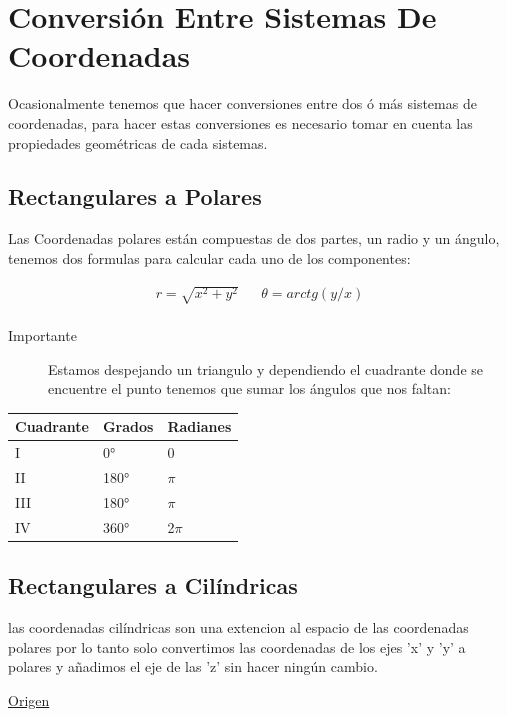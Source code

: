 \documentclass{article}
\begin{document}
\section{Conversión Entre Sistemas De Coordenadas}
\label{sec:org9221d06}
Ocasionalmente tenemos que hacer conversiones entre dos ó más sistemas de coordenadas, para hacer estas conversiones es necesario tomar en cuenta las propiedades geométricas de cada sistemas.

\subsection{Rectangulares a Polares}
\label{sec:org0ee6b6f}
Las Coordenadas polares están compuestas de dos partes, un radio y un ángulo, tenemos dos formulas para calcular cada uno de los componentes: 

\[\begin{aligned}
 r = \sqrt{x^2+y^2} && \theta = arctg\left(y/x\right) \\
\end{aligned}\] 

\begin{description}
\item[{Importante}] Estamos despejando un triangulo y dependiendo el cuadrante donde se encuentre el punto tenemos que sumar los ángulos que nos faltan:
\end{description}

\begin{center}
\label{tab:org97f36ce}
\begin{tabular}{lll}
Cuadrante & Grados & Radianes\\
\hline
I & 0° & 0\\
II & 180° & \(\pi\)\\
III & 180° & \(\pi\)\\
IV & 360° & 2\(\pi\)\\
\end{tabular}
\end{center}

\subsection{Rectangulares a Cilíndricas}
\label{sec:orgc6924c7}
las coordenadas cilíndricas son una extencion al espacio de las coordenadas polares por lo tanto solo convertimos las coordenadas de los ejes 'x' y 'y' a polares y añadimos el eje de las 'z' sin hacer ningún cambio.

\href{http://www.learningaboutelectronics.com/Articulos/Calculadora-de-conversion-de-coordenadas-cartesianas-a-cilindricas.php}{Origen}
\end{document}
